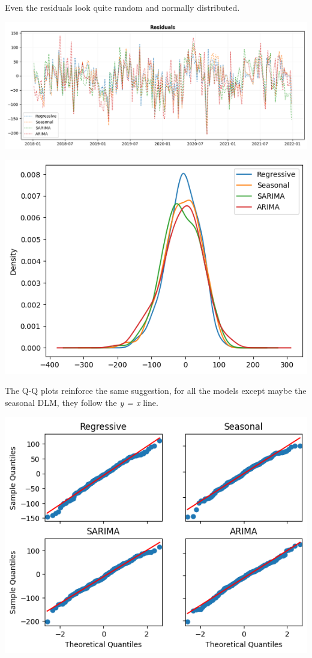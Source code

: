 \documentclass[a4paper,12pt]{article}
\begin{document}
Even the residuals look quite random and normally distributed.

\begin{center}
\includegraphics[width=1.00\textwidth]{./images/bhadla/weeklyResid.png}
\end{center}

\begin{center}
\includegraphics[width=0.8\linewidth]{./images/bhadla/weeklyDist.png}
\end{center}

The Q-Q plots reinforce the same suggestion, for all the models except maybe the seasonal DLM, they follow the \emph{y = x} line.

\begin{center}
\includegraphics[width=0.8\linewidth]{./images/bhadla/weeklyQQ.png}
\end{center}
\pagebreak
\end{document}
